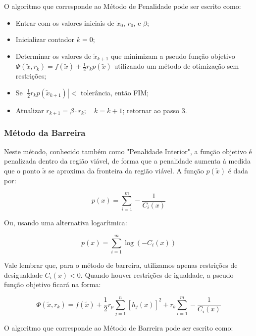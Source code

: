 \documentclass[a4paper, 12pt]{article}
\begin{document}
O algoritmo que corresponde ao Método de Penalidade pode ser escrito como:

\begin{itemize}
    \item Entrar com os valores iniciais de $\tilde{x}_0$, $r_0$, e $\beta$;
    \item Inicializar contador $k=0$;
    \item Determinar os valores de $\tilde{x}_{k+1}$ que minimizam a pseudo função objetivo $\Phi(\tilde{x}, r_k) = f(\tilde{x}) +\frac{1}{2} r_k p(\tilde{x})$ utilizando um método de otimização sem restrições;
    \item Se $\left| \frac{1}{2} r_k p(\tilde{x}_{k+1}) \right| <$ tolerância, então FIM;
    \item Atualizar $r_{k+1} = \beta \cdot r_k; \quad k = k+1$; retornar ao passo 3.
\end{itemize}

\subsubsection{Método da Barreira}

Neste método, conhecido também como "Penalidade Interior", a função objetivo é penalizada dentro da região viável, de forma que a penalidade aumenta à medida que o ponto $\tilde{x}$ se aproxima da fronteira da região viável. A função $p(\tilde{x})$ é dada por:

\begin{equation}
    p(x) = \sum\limits_{i=1}^{m} - \frac{1}{C_i(x)}
\end{equation}

Ou, usando uma alternativa logarítmica:

\begin{equation}
    p(x) = \sum\limits_{i=1}^{m} \log \left( -C_i(x) \right)
\end{equation}

Vale lembrar que, para o método de barreira, utilizamos apenas restrições de desigualdade $C_i(x) < 0$. Quando houver restrições de igualdade, a pseudo função objetivo ficará na forma:

\begin{equation}\label{exp_barreira}
    \Phi(\tilde{x}, r_k) = f(\tilde{x}) +\frac{1}{2} r_p \sum\limits_{j=1}^{n} \left[ h_j(x) \right]^2 + r_b \sum\limits_{i=1}^{m} - \frac{1}{C_i(x)}
\end{equation}

O algoritmo que corresponde ao Método de Barreira pode ser escrito como:
\end{document}
